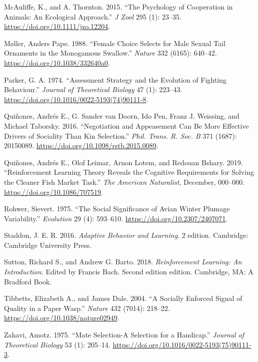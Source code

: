 \documentclass[
  12pt,
]{article}
\newlength{\cslhangindent}
\newlength{\cslentryspacingunit} %
\newenvironment{CSLReferences}[2] %
 {%
  \setlength{\parindent}{0pt}
  \ifodd #1
  \let\oldpar\par
  \def\par{\hangindent=\cslhangindent\oldpar}
  \fi
  \setlength{\parskip}{#2\cslentryspacingunit}
 }%
 {}
\begin{document}
\begin{CSLReferences}{1}{0}
\leavevmode{}%
McAuliffe, K., and A. Thornton. 2015. {``The Psychology of Cooperation
in Animals: An Ecological Approach.''} \emph{J Zool} 295 (1): 23--35.
\url{https://doi.org/10.1111/jzo.12204}.

\leavevmode{}%
Møller, Anders Pape. 1988. {``Female Choice Selects for Male Sexual Tail
Ornaments in the Monogamous Swallow.''} \emph{Nature} 332 (6165):
640--42. \url{https://doi.org/10.1038/332640a0}.

\leavevmode{}%
Parker, G. A. 1974. {``Assessment Strategy and the Evolution of Fighting
Behaviour.''} \emph{Journal of Theoretical Biology} 47 (1): 223--43.
\url{https://doi.org/10.1016/0022-5193(74)90111-8}.

\leavevmode{}%
Quiñones, Andrés E., G. Sander van Doorn, Ido Pen, Franz J. Weissing,
and Michael Taborsky. 2016. {``Negotiation and Appeasement Can Be More
Effective Drivers of Sociality Than Kin Selection.''} \emph{Phil. Trans.
R. Soc. B} 371 (1687): 20150089.
\url{https://doi.org/10.1098/rstb.2015.0089}.

\leavevmode{}%
Quiñones, Andrés E., Olof Leimar, Arnon Lotem, and Redouan Bshary. 2019.
{``Reinforcement {Learning Theory Reveals} the {Cognitive Requirements}
for {Solving} the {Cleaner Fish Market Task}.''} \emph{The American
Naturalist}, December, 000--000. \url{https://doi.org/10.1086/707519}.

\leavevmode{}%
Rohwer, Sievert. 1975. {``The {Social Significance} of {Avian Winter
Plumage Variability}.''} \emph{Evolution} 29 (4): 593--610.
\url{https://doi.org/10.2307/2407071}.

\leavevmode{}%
Staddon, J. E. R. 2016. \emph{Adaptive {Behavior} and {Learning}}. 2
edition. {Cambridge}: {Cambridge University Press}.

\leavevmode{}%
Sutton, Richard S., and Andrew G. Barto. 2018. \emph{Reinforcement
{Learning}: {An Introduction}}. Edited by Francis Bach. Second edition
edition. {Cambridge, MA}: {A Bradford Book}.

\leavevmode{}%
Tibbetts, Elizabeth A., and James Dale. 2004. {``A Socially Enforced
Signal of Quality in a Paper Wasp.''} \emph{Nature} 432 (7014): 218--22.
\url{https://doi.org/10.1038/nature02949}.

\leavevmode{}%
Zahavi, Amotz. 1975. {``Mate Selection\textemdash -{A} Selection for a
Handicap.''} \emph{Journal of Theoretical Biology} 53 (1): 205--14.
\url{https://doi.org/10.1016/0022-5193(75)90111-3}.

\end{CSLReferences}
\end{document}
